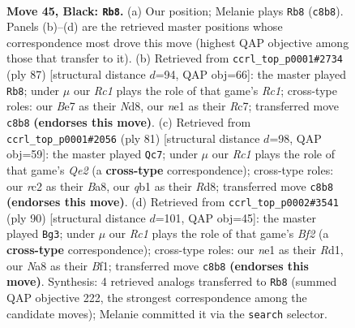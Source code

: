 \documentclass[11pt]{article}
\begin{document}
\clearpage

\begin{figure}[p]\centering
\begin{subfigure}{0.46\textwidth}\centering
\resizebox{\linewidth}{!}{%
\newchessgame
\chessboard[
  setfen={n1r1n1k1/4b3/p4r2/P1pq1p1p/3p1Pp1/1P4P1/2RBP2P/RQ1NN1K1 b - - 7 45},
  showmover=false,
  pgfstyle=straightmove, color=movearrow, markmove={c8-b8}
]}
\caption{}
\end{subfigure}\hfill
\begin{subfigure}{0.46\textwidth}\centering
\resizebox{\linewidth}{!}{%
\newchessgame
\chessboard[
  setfen={2rn4/2rq3k/2p1p1p1/p3Pp1p/Pp1P3P/1B4P1/5P1K/2RR1Q2 b - - 11 44},
  showmover=false,
  pgfstyle=straightmove, color=movearrow, markmove={c8-b8}
]}
\caption{}
\end{subfigure}
\\[4pt]
\begin{subfigure}{0.46\textwidth}\centering
\resizebox{\linewidth}{!}{%
\newchessgame
\chessboard[
  setfen={b2r2k1/4q1p1/1p1pprn1/6b1/PpP4p/1P3P1P/2Q1N1PB/R2R1B1K b - - 3 41},
  showmover=false,
  pgfstyle=straightmove, color=movearrow, markmove={e7-c7}
]}
\caption{}
\end{subfigure}\hfill
\begin{subfigure}{0.46\textwidth}\centering
\resizebox{\linewidth}{!}{%
\newchessgame
\chessboard[
  setfen={br1rq3/4bppk/3pp1np/1p6/1P2P3/PQ3P1P/3RNBP1/3R1B1K w - - 20 46},
  showmover=false,
  pgfstyle=straightmove, color=movearrow, markmove={f2-g3}
]}
\caption{}
\end{subfigure}
\caption{\textbf{Move 45, Black: \texttt{Rb8}.} (a) Our position; Melanie plays \texttt{Rb8} (\texttt{c8b8}). Panels (b)--(d) are the retrieved master positions whose correspondence most drove this move (highest QAP objective among those that transfer to it). (b) Retrieved from \texttt{ccrl\_top\_p0001\#2734} (ply 87) [structural distance $d$=94, QAP obj=66]: the master played \texttt{Rb8}; under $\mu$ our \emph{Rc1} plays the role of that game's \emph{Rc1}; cross-type roles: our \emph{B}e7 as their \emph{N}d8, our \emph{n}e1 as their \emph{R}c7; transferred move \texttt{c8b8} \textbf{(endorses this move)}. (c) Retrieved from \texttt{ccrl\_top\_p0001\#2056} (ply 81) [structural distance $d$=98, QAP obj=59]: the master played \texttt{Qc7}; under $\mu$ our \emph{Rc1} plays the role of that game's \emph{Qe2} (a \textbf{cross-type} correspondence); cross-type roles: our \emph{r}c2 as their \emph{B}a8, our \emph{q}b1 as their \emph{R}d8; transferred move \texttt{c8b8} \textbf{(endorses this move)}. (d) Retrieved from \texttt{ccrl\_top\_p0002\#3541} (ply 90) [structural distance $d$=101, QAP obj=45]: the master played \texttt{Bg3}; under $\mu$ our \emph{Rc1} plays the role of that game's \emph{Bf2} (a \textbf{cross-type} correspondence); cross-type roles: our \emph{n}e1 as their \emph{R}d1, our \emph{N}a8 as their \emph{B}f1; transferred move \texttt{c8b8} \textbf{(endorses this move)}. Synthesis: 4 retrieved analogs transferred to \texttt{Rb8} (summed QAP objective 222, the strongest correspondence among the candidate moves); Melanie committed it via the \texttt{search} selector.}
\label{fig:thought-m89}
\end{figure}
\end{document}
